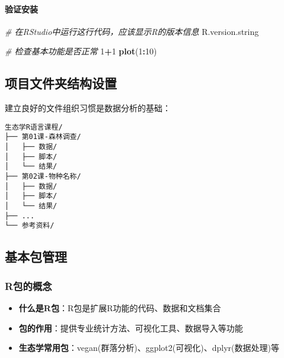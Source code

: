 \documentclass[
]{book}
\newenvironment{Shaded}{\begin{snugshade}}{\end{snugshade}}
\newcommand{\CommentTok}[1]{\textcolor[rgb]{0.56,0.35,0.01}{\textit{#1}}}
\newcommand{\DecValTok}[1]{\textcolor[rgb]{0.00,0.00,0.81}{#1}}
\newcommand{\FunctionTok}[1]{\textcolor[rgb]{0.13,0.29,0.53}{\textbf{#1}}}
\newcommand{\NormalTok}[1]{#1}
\newcommand{\SpecialCharTok}[1]{\textcolor[rgb]{0.81,0.36,0.00}{\textbf{#1}}}
\providecommand{\tightlist}{%
  \setlength{\itemsep}{0pt}\setlength{\parskip}{0pt}}
\begin{document}
\hypertarget{ux9a8cux8bc1ux5b89ux88c5}{%
\paragraph{验证安装}\label{ux9a8cux8bc1ux5b89ux88c5}}

\begin{Shaded}
\begin{Highlighting}[]
\CommentTok{\# 在RStudio中运行这行代码，应该显示R的版本信息}
\NormalTok{R.version.string}

\CommentTok{\# 检查基本功能是否正常}
\DecValTok{1}\SpecialCharTok{+}\DecValTok{1}
\FunctionTok{plot}\NormalTok{(}\DecValTok{1}\SpecialCharTok{:}\DecValTok{10}\NormalTok{)}
\end{Highlighting}
\end{Shaded}

\hypertarget{ux9879ux76eeux6587ux4ef6ux5939ux7ed3ux6784ux8bbeux7f6e}{%
\subsection{项目文件夹结构设置}\label{ux9879ux76eeux6587ux4ef6ux5939ux7ed3ux6784ux8bbeux7f6e}}

建立良好的文件组织习惯是数据分析的基础：

\begin{verbatim}
生态学R语言课程/
├── 第01课-森林调查/
│   ├── 数据/
│   ├── 脚本/
│   └── 结果/
├── 第02课-物种名称/
│   ├── 数据/
│   ├── 脚本/
│   └── 结果/
├── ...
└── 参考资料/
\end{verbatim}

\hypertarget{ux57faux672cux5305ux7ba1ux7406}{%
\subsection{基本包管理}\label{ux57faux672cux5305ux7ba1ux7406}}

\hypertarget{rux5305ux7684ux6982ux5ff5}{%
\subsubsection{R包的概念}\label{rux5305ux7684ux6982ux5ff5}}

\begin{itemize}
\tightlist
\item
  \textbf{什么是R包}：R包是扩展R功能的代码、数据和文档集合
\item
  \textbf{包的作用}：提供专业统计方法、可视化工具、数据导入等功能
\item
  \textbf{生态学常用包}：vegan(群落分析)、ggplot2(可视化)、dplyr(数据处理)等
\end{itemize}
\end{document}
